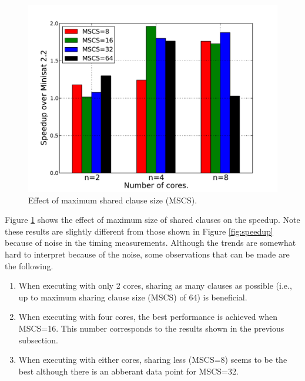 \documentclass[letterpaper, compsoc, conference]{IEEEtran}
\begin{document}
\begin{figure}[htbp]
    \begin{center}
        \includegraphics[width=\columnwidth]{images/mcs.pdf}
        \caption{Effect of maximum shared clause size (MSCS).}
        \label{fig:mscs}
    \end{center}
\end{figure}

Figure \ref{fig:mscs} shows the effect of maximum size of shared clauses on the
speedup. Note these results are slightly different from those shown in Figure
\ref{fig:speedup} because of noise in the timing measurements. Although the
trends are somewhat hard to interpret because of the noise, some observations
that can be made are the following.

\begin{enumerate}

\item When executing with only 2 cores, sharing as many clauses as possible
(i.e., up to maximum sharing clause size (MSCS) of 64) is beneficial.

\item When executing with four cores, the best performance is achieved when
MSCS=16. This number corresponds to the results shown in the previous
subsection.

\item When executing with either cores, sharing less (MSCS=8) seems to be the
best although there is an abberant data point for MSCS=32.
      
\end{enumerate}
\end{document}

